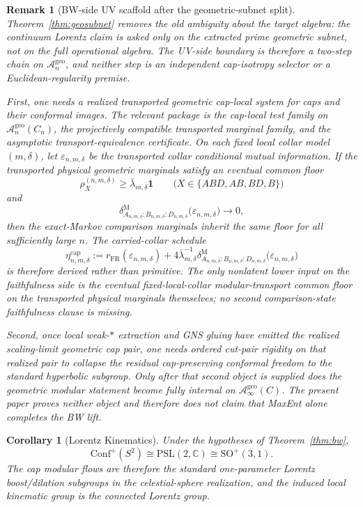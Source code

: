 \documentclass[11pt]{article}
\newtheorem{corollary}[theorem]{Corollary}
\newtheorem{remark}[theorem]{Remark}
\newcommand{\Conf}{\mathrm{Conf}}
\begin{document}
\begin{remark}[BW-side UV scaffold after the geometric-subnet split]
Theorem~\ref{thm:geosubnet} removes the old ambiguity about the target algebra: the continuum Lorentz claim is asked only on the extracted prime geometric subnet, not on the full operational algebra. The UV-side boundary is therefore a two-step chain on \(\mathcal A_n^{\mathrm{geo}}\), and neither step is an independent cap-isotropy selector or a Euclidean-regularity premise.

First, one needs a \emph{realized transported geometric cap-local system} for caps and their conformal images. The relevant package is the cap-local test family on \(\mathcal A_n^{\mathrm{geo}}(C_n)\), the projectively compatible transported marginal family, and the asymptotic transport-equivalence certificate. On each fixed local collar model \((m,\delta)\), let \(\varepsilon_{n,m,\delta}\) be the transported collar conditional mutual information. If the transported physical geometric marginals satisfy an eventual common floor
\[
\rho_X^{(n,m,\delta)}\ge \bar\lambda_{m,\delta}\mathbf 1
\qquad
\bigl(X\in\{ABD,AB,BD,B\}\bigr)
\]
and
\[
\delta^{\mathrm M}_{A_{n,m,\delta}:B_{n,m,\delta}:D_{n,m,\delta}}
\bigl(\varepsilon_{n,m,\delta}\bigr)\to 0,
\]
then the exact-Markov comparison marginals inherit the same floor for all sufficiently large \(n\). The carried-collar schedule
\[
\eta_{n,m,\delta}^{\mathrm{cap}}
:=
r_{\mathrm{FR}}(\varepsilon_{n,m,\delta})
+
4\bar\lambda_{m,\delta}^{-1}
\delta^{\mathrm M}_{A_{n,m,\delta}:B_{n,m,\delta}:D_{n,m,\delta}}
\bigl(\varepsilon_{n,m,\delta}\bigr)
\]
is therefore \emph{derived rather than primitive}. The only nonlatent lower input on the faithfulness side is the eventual fixed-local-collar modular-transport common floor on the transported physical marginals themselves; no second comparison-state faithfulness clause is missing.

Second, once local weak-\(*\) extraction and GNS gluing have emitted the realized scaling-limit geometric cap pair, one needs \emph{ordered cut-pair rigidity} on that realized pair to collapse the residual cap-preserving conformal freedom to the standard hyperbolic subgroup. Only after that second object is supplied does the geometric modular statement become fully internal on \(\mathcal A_\infty^{\mathrm{geo}}(C)\). The present paper proves neither object and therefore does not claim that MaxEnt alone completes the BW lift.
\end{remark}

\begin{corollary}[Lorentz Kinematics]\label{cor:lorentz}
Under the hypotheses of Theorem~\ref{thm:bw},
\[
\Conf^+(S^2)\cong \mathrm{PSL}(2,\mathbb C)\cong \mathrm{SO}^+(3,1).
\]
The cap modular flows are therefore the standard one-parameter Lorentz boost/dilation subgroups in the celestial-sphere realization, and the induced local kinematic group is the connected Lorentz group.
\end{corollary}
\end{document}
